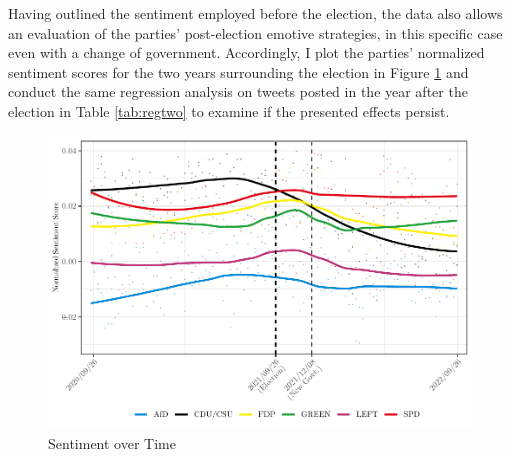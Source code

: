 \documentclass[a4paper,11pt]{article}
\begin{document}
Having outlined the sentiment employed before the election, the data also allows an evaluation of the parties' post-election emotive strategies, in this specific case even with a change of government. Accordingly, I plot the parties' normalized sentiment scores for the two years surrounding the election in Figure \texttt{\ref{fig:plotsentimentweekly}} and conduct the same regression analysis on tweets posted in the year after the election in Table \ref{tab:regtwo} to examine if the presented effects persist.

\newpage
\begin{figure}[H]

{\centering \includegraphics[width=0.95\linewidth]{thesis_files/figure-latex/plotsentimentweekly-1} 

}

\caption{Sentiment over Time}\label{fig:plotsentimentweekly}
\end{figure}
\end{document}
